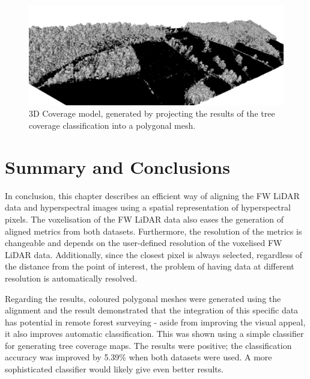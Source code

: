 \documentclass{subfiles}
\begin{document}
\begin{figure} [h!]
	\centering
	\includegraphics[width=\textwidth]{img/CoverageProjected}
	\caption[3D Coverage Model]{3D Coverage model, generated by projecting the results of the tree coverage classification into a polygonal mesh.}
	\label{fig:CoverageProjectedPolygon}
\end{figure}

\newpage\newpage
\section {Summary and Conclusions}
\par In conclusion, this chapter describes an efficient way of aligning the FW LiDAR data and hyperspectral images using a spatial representation of hyperspectral pixels. The voxelisation of the FW LiDAR data also eases the generation of aligned metrics from both datasets. Furthermore, the resolution of the metrics is changeable and depends on the user-defined resolution of the voxelised FW LiDAR data. Additionally, since the closest pixel is always selected, regardless of the distance from the point of interest, the problem of having data at different resolution is automatically resolved. 

\par Regarding the results, coloured polygonal meshes were generated using the alignment and the result demonstrated that the integration of this specific data has potential in remote forest surveying - aside from improving the visual appeal, it also improves automatic classification. This was shown using a simple classifier for generating tree coverage maps. The results were positive; the classification accuracy was improved by 5.39\% when both datasets were used.  A more sophisticated classifier would likely give even better results.
\end{document}
